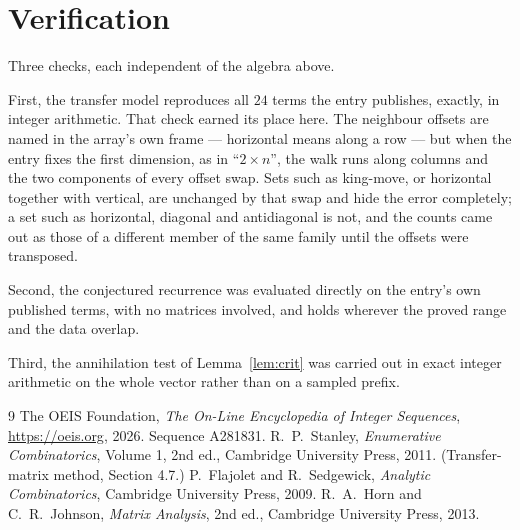 \documentclass[11pt,a4paper]{article}
\theoremstyle{plain}
\theoremstyle{definition}
\begin{document}
\section{Verification}

Three checks, each independent of the algebra above.

First, the transfer model reproduces all $24$ terms the entry publishes, exactly, in
integer arithmetic. That check earned its place here. The neighbour offsets are named in the
array's own frame --- horizontal means along a row --- but when the entry fixes the first
dimension, as in ``$2\times n$'', the walk runs along columns and the two components of every
offset swap. Sets such as king-move, or horizontal together with vertical, are unchanged by
that swap and hide the error completely; a set such as horizontal, diagonal and antidiagonal
is not, and the counts came out as those of a different member of the same family until the
offsets were transposed.

Second, the conjectured recurrence was evaluated directly on the entry's own published terms,
with no matrices involved, and holds wherever the proved range and the data overlap.

Third, the annihilation test of Lemma~\ref{lem:crit} was carried out in exact integer
arithmetic on the whole vector rather than on a sampled prefix.

\begin{thebibliography}{9}
 The OEIS Foundation, \emph{The On-Line Encyclopedia of Integer
Sequences}, \url{https://oeis.org}, 2026. Sequence A281831.
 R.~P.~Stanley, \emph{Enumerative Combinatorics}, Volume 1, 2nd ed.,
Cambridge University Press, 2011. (Transfer-matrix method, Section 4.7.)
 P.~Flajolet and R.~Sedgewick, \emph{Analytic Combinatorics}, Cambridge
University Press, 2009.
 R.~A.~Horn and C.~R.~Johnson, \emph{Matrix Analysis}, 2nd ed., Cambridge
University Press, 2013.
\end{thebibliography}
\end{document}
